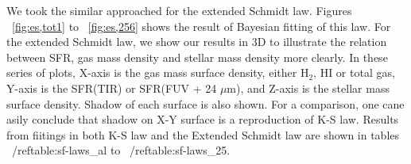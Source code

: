 \documentclass[useAMS,usenatbib]{mn2e}
\begin{document}
We took the similar approached for the extended Schmidt law. Figures ~\ref{fig:es,tot1} to ~\ref{fig:es,256} shows the result of Bayesian fitting of this law. For the extended Schmidt law, we show our results in 3D to illustrate the relation between SFR, gas mass density and stellar mass density more clearly. In these series of plots, X-axis is the gas mass  surface density, either H$_2$, HI or total gas, Y-axis is the SFR(TIR) or SFR(FUV + 24 $\mu$m), and Z-axis is the stellar mass surface density. Shadow of each surface is also shown. For a comparison, one cane asily conclude that shadow on X-Y surface is a reproduction of K-S law.  Results from fiitings in both K-S law and the Extended Schmidt law are shown in tables ~/ref{table:sf-laws_al} to ~/ref{table:sf-laws_25}. 






\end{document}
